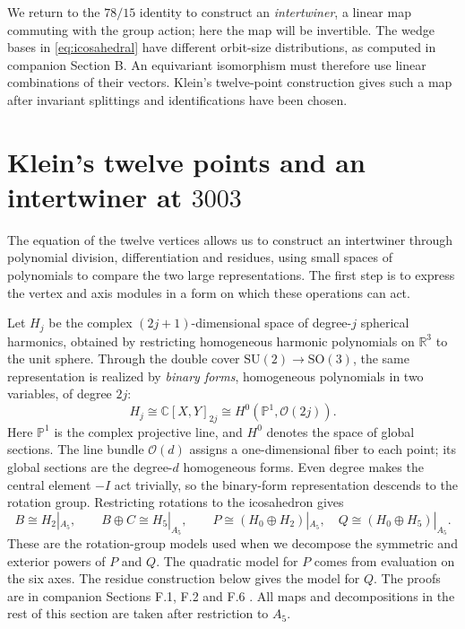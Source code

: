 \documentclass[11pt,a4paper]{article}
\begin{document}
We return to the \(78/15\) identity to construct an \emph{intertwiner}, a linear map commuting with the group action; here the map will be invertible. The wedge bases in \eqref{eq:icosahedral} have different orbit-size distributions, as computed in companion Section B. An equivariant isomorphism must therefore use linear combinations of their vectors. Klein's twelve-point construction gives such a map after invariant splittings and identifications have been chosen.

\section[Klein's twelve points and an intertwiner at 3003]{Klein's twelve points and an intertwiner at $3003$}\label{sec:klein}

The equation of the twelve vertices allows us to construct an intertwiner through polynomial division, differentiation and residues, using small spaces of polynomials to compare the two large representations. The first step is to express the vertex and axis modules in a form on which these operations can act.

Let $H_j$ be the complex $(2j+1)$-dimensional space of degree-$j$ spherical harmonics, obtained by restricting homogeneous harmonic polynomials on $\mathbb R^3$ to the unit sphere. Through the double cover $\mathrm{SU}(2)\to\mathrm{SO}(3)$, the same representation is realized by \emph{binary forms}, homogeneous polynomials in two variables, of degree $2j$:
\[
H_j\cong\mathbb C[X,Y]_{2j}
       \cong H^0(\mathbb P^1,\mathcal O(2j)).
\]
Here $\mathbb P^1$ is the complex projective line, and $H^0$ denotes the space of global sections. The line bundle $\mathcal O(d)$ assigns a one-dimensional fiber to each point; its global sections are the degree-$d$ homogeneous forms. Even degree makes the central element $-I$ act trivially, so the binary-form representation descends to the rotation group. Restricting rotations to the icosahedron gives
\[
B\cong H_2|_{A_5},\qquad B\oplus C\cong H_5|_{A_5},\qquad
P\cong(H_0\oplus H_2)|_{A_5},\quad Q\cong(H_0\oplus H_5)|_{A_5}.
\]
These are the rotation-group models used when we decompose the symmetric and exterior powers of $P$ and $Q$. The quadratic model for $P$ comes from evaluation on the six axes. The residue construction below gives the model for $Q$. The proofs are in companion Sections F.1, F.2 and F.6 \citep{Companion2026}. All maps and decompositions in the rest of this section are taken after restriction to $A_5$.
\end{document}
